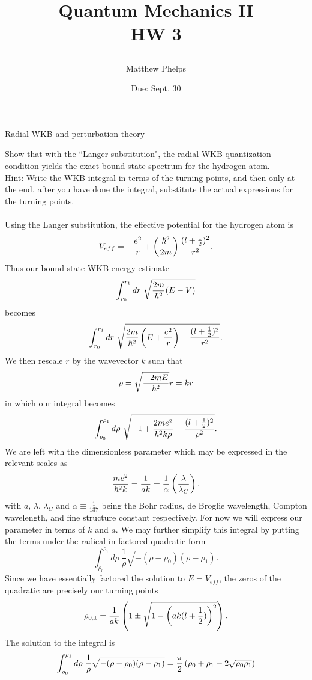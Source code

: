 \documentclass[10pt,letterpaper]{article}
\title{\begin{spacing}{1.2}Quantum Mechanics II\\HW 3\end{spacing}}
\author{Matthew Phelps}
\date{Due: Sept. 30}
\begin{document}
\maketitle

\benum
  	\item 
	Radial WKB and perturbation theory
	\benum
		\item
		Show that with the ``Langer substitution", the radial WKB quantization condition yields the exact bound state spectrum for
		the hydrogen atom. \\
		Hint: Write the WKB integral in terms of the turning points, and then only at the end, after you have done
		the integral, substitute the actual expressions for the turning points.
		\\
		\\
		Using the Langer substitution, the effective potential for the hydrogen atom is
		\[
			V_{eff} = -\frac{e^2}{r}+\left(\frac{\hbar^2}{2m}\right)\frac{(l+\frac{1}{2})^2}{r^2}.
		\]
		Thus our bound state WKB energy estimate
		\[
			\int_{r_0}^{r_1} dr\ \sqrt{\frac{2m}{\h^2}(E-V)}
		\]
		becomes
		\[
			\int_{r_0}^{r_1} dr\ \sqrt{\frac{2m}{\h^2}\plr{E+\frac{e^2}{r}}-\frac{(l+\frac{1}{2})^2}{r^2}}.
		\]
		We then rescale $r$ by the wavevector $k$ such that 
		\[
			\rho  = \sqrt{\frac{-2mE}{\hbar^2}}r = kr
		\]
		in which our integral becomes
		\[
			\int_{\rho_0}^{\rho_1} d\rho\ \sqrt{-1+\frac{2me^2}{\h^2k\rho}-\frac{(l+\frac{1}{2})^2}{\rho^2}}.
		\]
		We are left with the dimensionless parameter which may be expressed in the relevant scales as
		\[
			\frac{me^2}{\hbar^2 k} = \frac{1}{ak} = \frac{1}{\alpha}\left(\frac{\lambda}{\lambda_C}\right).
		\]
		with $a$, $\lambda$, $\lambda_C$ and $\alpha \equiv \frac{1}{137}$ being the Bohr radius, de Broglie wavelength, Compton 
		wavelength, and fine structure constant respectively. For now we will express our parameter in terms of $k$ and $a$. We
		may further simplify this integral by putting the terms under the radical in factored quadratic form
		\[
			\int_{\rho_0}^{\rho_1} d\rho\ \frac{1}{\rho}\sqrt{-(\rho-\rho_0)(\rho-\rho_1)}.
		\]
		Since we have essentially factored the solution to $E=V_{eff}$, the zeros of the quadratic are precisely our turning points
		\[
			\rho_{0,1} = \frac{1}{ak}\left(1\pm \sqrt{1-\left(ak(l+\frac{1}{2})\right)^2}\right).
		\]
		The solution to the integral is
		\[
			\int_{\rho_0}^{\rho_1} d\rho\ \frac{1}{\rho}\sqrt{-(\rho-\rho_0)(\rho-\rho_1)} = \frac{\pi}{2}\plr{\rho_0+\rho_1
			-2\sqrt{\rho_0\rho_1}}
		\]
\end{document}
